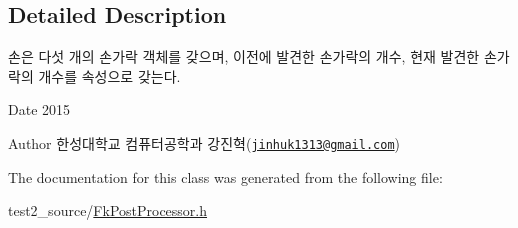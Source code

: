 \subsection{Detailed Description}
손은 다섯 개의 손가락 객체를 갖으며, 이전에 발견한 손가락의 개수, 현재 발견한 손가락의 개수를 속성으로 갖는다. 

\begin{DoxyDate}{Date}
2015 
\end{DoxyDate}
\begin{DoxyAuthor}{Author}
한성대학교 컴퓨터공학과 강진혁(\href{mailto:jinhuk1313@gmail.com}{\tt jinhuk1313@gmail.\+com}) 
\end{DoxyAuthor}


The documentation for this class was generated from the following file\+:\begin{DoxyCompactItemize}
\item 
test2\+\_\+source/\hyperlink{_fk_post_processor_8h}{Fk\+Post\+Processor.\+h}\end{DoxyCompactItemize}
